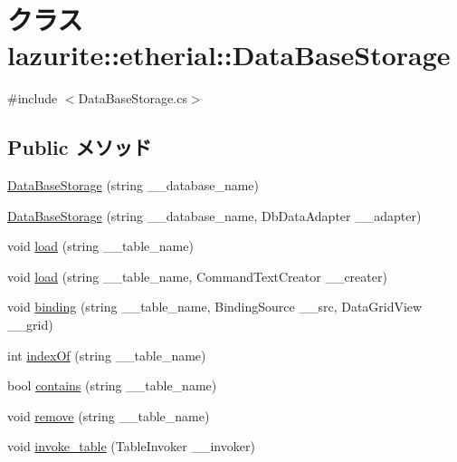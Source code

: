 \hypertarget{classlazurite_1_1etherial_1_1_data_base_storage}{
\section{クラス lazurite::etherial::DataBaseStorage}
\label{classlazurite_1_1etherial_1_1_data_base_storage}
}


{\ttfamily \#include $<$DataBaseStorage.cs$>$}\subsection*{Public メソッド}
\begin{DoxyCompactItemize}
\item 
\hyperlink{classlazurite_1_1etherial_1_1_data_base_storage_ac3e690a84cb81e9b92054e2c8195c39f}{DataBaseStorage} (string \_\-\_\-database\_\-name)
\item 
\hyperlink{classlazurite_1_1etherial_1_1_data_base_storage_a4602bffc4672a2df0292d4a39ee52def}{DataBaseStorage} (string \_\-\_\-database\_\-name, DbDataAdapter \_\-\_\-adapter)
\item 
void \hyperlink{classlazurite_1_1etherial_1_1_data_base_storage_aa7942198cc4237c33f8867f717c052bf}{load} (string \_\-\_\-table\_\-name)
\item 
void \hyperlink{classlazurite_1_1etherial_1_1_data_base_storage_af54444ae47537e9d80854457a43b0574}{load} (string \_\-\_\-table\_\-name, CommandTextCreator \_\-\_\-creater)
\item 
void \hyperlink{classlazurite_1_1etherial_1_1_data_base_storage_a5aa77ecd6cb359e04cd2c12a06827516}{binding} (string \_\-\_\-table\_\-name, BindingSource \_\-\_\-src, DataGridView \_\-\_\-grid)
\item 
int \hyperlink{classlazurite_1_1etherial_1_1_data_base_storage_ab5f5412eaedc79f9845ce2e9d085d4cd}{indexOf} (string \_\-\_\-table\_\-name)
\item 
bool \hyperlink{classlazurite_1_1etherial_1_1_data_base_storage_acb77614ca2b4481f31c86acaf305acd1}{contains} (string \_\-\_\-table\_\-name)
\item 
void \hyperlink{classlazurite_1_1etherial_1_1_data_base_storage_a4dfd199a157268d3e6e0d356b7031bdd}{remove} (string \_\-\_\-table\_\-name)
\item 
void \hyperlink{classlazurite_1_1etherial_1_1_data_base_storage_a4799451dac40d2f2939709bb84cb6212}{invoke\_\-table} (TableInvoker \_\-\_\-invoker)
\end{DoxyCompactItemize}
